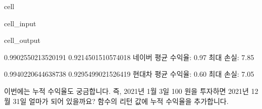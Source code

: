 \documentclass[letterpaper,10pt,english]{jupyterBook}
\begin{document}
\begin{sphinxuseclass}{cell}\begin{sphinxVerbatimInput}

\begin{sphinxuseclass}{cell_input}
\begin{sphinxVerbatim}[commandchars=\\\{\}]
    
 

    
 
\end{sphinxVerbatim}

\end{sphinxuseclass}\end{sphinxVerbatimInput}
\begin{sphinxVerbatimOutput}

\begin{sphinxuseclass}{cell_output}
\begin{sphinxVerbatim}[commandchars=\\\{\}]
0.9902550213520191 0.9214501510574018
네이버 평균 수익율: \PYGZhy{}0.97\PYGZpc{} 최대 손실: \PYGZhy{}7.85\PYGZpc{}


0.9940220644638738 0.9295499021526419
현대차 평균 수익율: \PYGZhy{}0.60\PYGZpc{} 최대 손실: \PYGZhy{}7.05\PYGZpc{}
\end{sphinxVerbatim}

\end{sphinxuseclass}\end{sphinxVerbatimOutput}

\end{sphinxuseclass}
\sphinxAtStartPar
 이번에는 누적 수익율도 궁금합니다. 즉, 2021년 1월 3일 100 원을 투자하면 2021년 12월 31일 얼마가 되어 있을까요? 함수의 리턴 값에 누적 수익율을 추가합니다.
\end{document}
